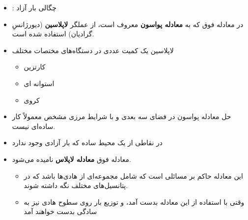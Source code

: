 \begin{ELunit}

\begin{itemize}
\item
  \ELim{\rho}: چگالی بار آزاد
\item
  در معادله فوق که به \textbf{معادله پواسون} معروف است، از عملگر \textbf{لاپلاسین} (دیورژانسِ گرادیان) استفاده شده است.
\item
  لاپلاسین یک کمیت عددی در دستگاه‌های مختصات مختلف

  \begin{itemize}
  \tightlist
  \item
    کارتزین
  \item
    استوانه ای
  \item
    کروی
  \end{itemize}
\item
  حل معادله پواسون در فضای سه بعدی و با شرایط مرزی مشخص معمولاً کار ساده‌ای نیست.
\item
  در نقاطی از یک محیط ساده که بار آزادی وجود ندارد
\end{itemize}

\end{ELunit}

\begin{ELimportant}{}


\end{ELimportant}

\begin{ELunit}

\begin{itemize}
\tightlist
\item
  معادله فوق \textbf{معادله لاپلاس} نامیده می‌شود.

  \begin{itemize}
  \tightlist
  \item
    این معادله حاکم بر مسائلی است که شامل مجموعه‌ای از هادی‌ها باشد که در پتانسیل‌های مختلف نگه داشته شوند.
  \item
    وقتی با استفاده از این معادله  بدست آمد،  و توزیع بار روی سطوح هادی نیز به سادگی بدست خواهند آمد
  \end{itemize}
\end{itemize}


\end{ELunit}

